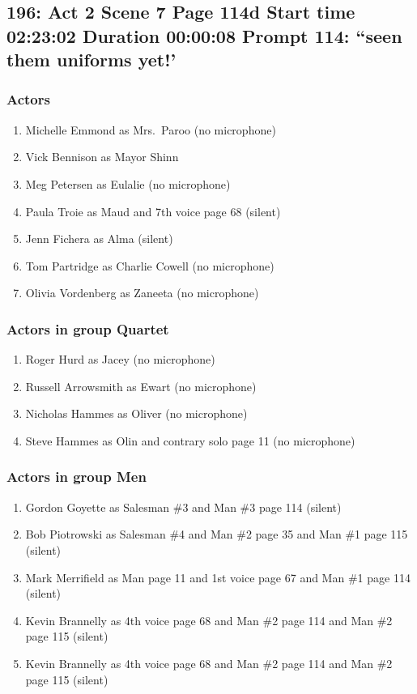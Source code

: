 \subsection{196: Act 2 Scene 7 Page 114d Start time 02:23:02 Duration 00:00:08 Prompt 114: ``seen them uniforms yet!'}

\subsubsection{Actors}
\begin{enumerate}
\item Michelle Emmond as Mrs.~Paroo (no microphone)
\item Vick Bennison as Mayor Shinn
\item Meg Petersen as Eulalie (no microphone)
\item Paula Troie as Maud and 7th voice page 68 (silent)
\item Jenn Fichera as Alma (silent)
\item Tom Partridge as Charlie Cowell (no microphone)
\item Olivia Vordenberg as Zaneeta (no microphone)
\end{enumerate}
\subsubsection{Actors in group Quartet}
\begin{enumerate}
\item Roger Hurd as Jacey (no microphone)
\item Russell Arrowsmith as Ewart (no microphone)
\item Nicholas Hammes as Oliver (no microphone)
\item Steve Hammes as Olin and contrary solo page 11 (no microphone)
\end{enumerate}
\subsubsection{Actors in group Men}
\begin{enumerate}
\item Gordon Goyette as Salesman \#3 and Man \#3 page 114 (silent)
\item Bob Piotrowski as Salesman \#4 and Man \#2 page 35 and Man \#1 page 115 (silent)
\item Mark Merrifield as Man page 11 and 1st voice page 67 and Man \#1 page 114 (silent)
\item Kevin Brannelly as 4th voice page 68 and Man \#2 page 114 and Man \#2 page 115 (silent)
\item Kevin Brannelly as 4th voice page 68 and Man \#2 page 114 and Man \#2 page 115 (silent)
\end{enumerate}

